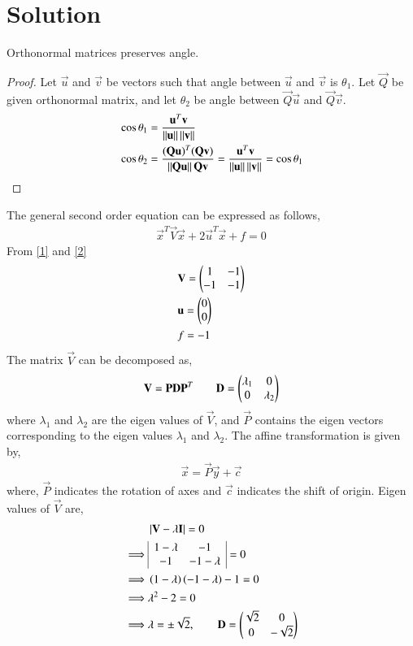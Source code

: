 \documentclass[journal,12pt,twocolumn]{IEEEtran}
\begin{document}
\section{Solution}
\begin{lemma}\label{4}
	Orthonormal matrices preserves angle.
\begin{proof}
	Let $\vec{u}$ and $\vec{v}$ be vectors such that angle between $\vec{u}$ and $\vec{v}$ is $\theta_1$. Let $\vec{Q}$ be given orthonormal matrix, and let $\theta_2$ be angle between $\vec{Q}\vec{u}$ and $\vec{Q}\vec{v}$.
\begin{align}
& \cos\theta_1 = \frac{\mathbf{u}^T\mathbf{v}}{\left\lVert\mathbf{u}\right\rVert\left\lVert\mathbf{v}\right\rVert} \\
& \cos\theta_2 = \frac{(\mathbf{Q}\mathbf{u})^T(\mathbf{Q}\mathbf{v})}{\left\lVert\mathbf{Q}\mathbf{u}\right\rVert\mathbf{Q}\mathbf{v}}= \frac{\mathbf{u}^T\mathbf{v}}{\left\lVert\mathbf{u}\right\rVert\left\lVert\mathbf{v}\right\rVert} = \cos\theta_1
\end{align}
\end{proof}
\end{lemma}
The general second order equation can be expressed as follows,
\begin{align}
	\vec{x}^T\vec{V}\vec{x} + 2\vec{u}^T\vec{x} + f = 0 \label{2}
\end{align}
From \eqref{1} and \eqref{2}
\begin{align}
	& \mathbf{V} = \begin{pmatrix}1 & -1 \\ -1 & -1\end{pmatrix} \\
	& \mathbf{u} = \begin{pmatrix}0 \\0\end{pmatrix}\\
	& f = -1
\end{align}
The matrix $\vec{V}$ can be decomposed as,
\begin{align}
	\mathbf V= \mathbf{P}\mathbf{D}\mathbf{P}^T \qquad \mathbf{D} = \begin{pmatrix}\lambda_1 & 0 \\ 0 & \lambda_2\end{pmatrix}
\end{align}
where $\lambda_1$ and $\lambda_2$ are the eigen values of $\vec{V}$, and $\vec{P}$ contains the eigen vectors corresponding to the eigen values $\lambda_1$ and $\lambda_2$. The affine transformation is given by,
\begin{align}
	\vec{x} = \vec{P}\vec{y} + \vec{c}
\end{align}
where, $\vec{P}$ indicates the rotation of axes and $\vec{c}$ indicates the shift of origin.
Eigen values of $\vec{V}$ are,
\begin{align}
	& \left\vert\mathbf{V}-\lambda\mathbf{I}\right\vert = 0 \\
\implies	& \begin{array}{|cc|}
		1-\lambda & -1\\ -1 & -1-\lambda
	\end{array}=0 \\
\implies & \left(1-\lambda\right)\left(-1-\lambda\right) -1 =0\\
\implies &\lambda^2 -2 =0 \\
\implies & \lambda = \pm \sqrt{2}, \qquad \mathbf{D} = \begin{pmatrix}\sqrt{2} &0 \\ 0 & -\sqrt{2}\end{pmatrix} 
\end{align}
\end{document}
